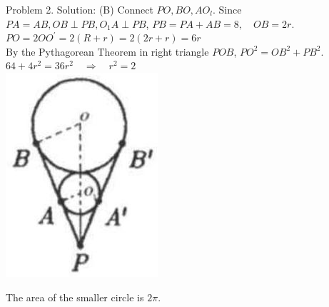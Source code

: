 \documentclass[10pt]{article}
\begin{document}
Problem 2. Solution: (B)
Connect \(P O, B O, A O_{l}\). Since \(P A=A B, O B \perp P B, O_{1} A \perp P B\), \(P B=P A+A B=8, \quad O B=2 r\).\\
\(P O=2 O O^{\prime}=2(R+r)=2(2 r+r)=6 r\)\\
By the Pythagorean Theorem in right triangle \(P O B\), \(P O^{2}=O B^{2}+P B^{2}\).\\
\(64+4 r^{2}=36 r^{2} \quad \Rightarrow \quad r^{2}=2\)\\
\includegraphics[max width=\textwidth, center]{2025_04_17_97bc1f7e44d93c271a88g-187(1)}

The area of the smaller circle is \(2 \pi\).
\end{document}

